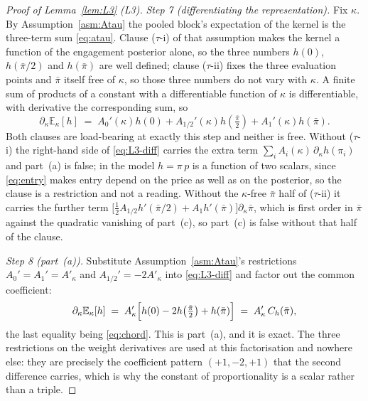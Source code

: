 \documentclass[11pt]{article}
\newcommand{\Eop}{\mathbb{E}}
\newcommand{\Akap}{A'_{\kappa}}
\begin{document}
\begin{proof}[Proof of Lemma~\ref{lem:L3} (L3)]
\emph{Step 7 (differentiating the representation).} Fix $\kappa$. By Assumption~\ref{asm:Atau} the
pooled block's expectation of the kernel is the three-term sum \eqref{eq:atau}. Clause ($\tau$-i) of
that assumption makes the kernel a function of the engagement posterior alone, so the three numbers
$h(0)$, $h(\bar\pi/2)$ and $h(\bar\pi)$ are well defined; clause ($\tau$-ii) fixes the three
evaluation points and $\bar\pi$ itself free of $\kappa$, so those three numbers do not vary with
$\kappa$. A finite sum of products of a constant with a differentiable function of $\kappa$ is
differentiable, with derivative the corresponding sum, so
\begin{equation}
\label{eq:L3-diff}
\partial_\kappa \Eop_\kappa[h] \;=\; A_0'(\kappa)h(0)
 + A_{1/2}'(\kappa)h\!\left(\tfrac{\bar\pi}{2}\right) + A_1'(\kappa)h(\bar\pi).
\end{equation}
Both clauses are load-bearing at exactly this step and neither is free. Without ($\tau$-i) the
right-hand side of \eqref{eq:L3-diff} carries the extra term
$\sum_i A_i(\kappa)\,\partial_\kappa h(\pi_i)$ and part~(a) is false; in the model
$h = \pi\,p$ is a function of two scalars, since \eqref{eq:entry} makes entry depend on the price as
well as on the posterior, so the clause is a restriction and not a reading. Without the $\kappa$-free
$\bar\pi$ half of ($\tau$-ii) it carries the further term
$\bigl[\tfrac12 A_{1/2}h'(\bar\pi/2) + A_1 h'(\bar\pi)\bigr]\partial_\kappa\bar\pi$, which is first
order in $\bar\pi$ against the quadratic vanishing of part~(c), so part~(c) is false without that
half of the clause.

\emph{Step 8 (part~(a)).} Substitute Assumption~\ref{asm:Atau}'s restrictions
$A_0' = A_1' = \Akap$ and $A_{1/2}' = -2\Akap$ into \eqref{eq:L3-diff} and factor out the common
coefficient:
\begin{equation}
\label{eq:L3-parta}
\partial_\kappa \Eop_\kappa[h]
 \;=\; \Akap\Bigl[h(0) - 2h\!\left(\tfrac{\bar\pi}{2}\right) + h(\bar\pi)\Bigr]
 \;=\; \Akap\,C_h(\bar\pi),
\end{equation}
the last equality being \eqref{eq:chord}. This is part~(a), and it is exact. The three restrictions
on the weight derivatives are used at this factorisation and nowhere else: they are precisely the
coefficient pattern $(+1,-2,+1)$ that the second difference carries, which is why the constant of
proportionality is a scalar rather than a triple.


\end{proof}
\end{document}
